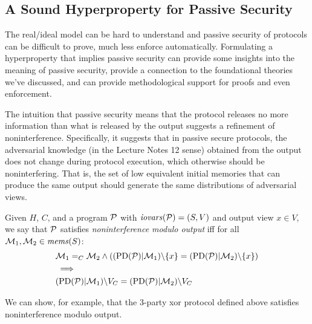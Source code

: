 
\subsection{A Sound Hyperproperty for Passive Security} The real/ideal
model can be hard to understand and passive security of protocols can
be difficult to prove, much less enforce automatically. Formulating
a hyperproperty that implies passive security can provide some
insights into the meaning of passive security, provide a connection
to the foundational theories we've discussed, and can provide
methodological support for proofs and even enforcement.

The intuition that passive security means that the protocol releases
no more information than what is released by the output suggests a
refinement of noninterference. Specifically, it suggests that in
passive secure protocols, the adversarial knowledge (in the Lecture
Notes 12 sense) obtained from the output does not change during
protocol execution, which otherwise should be noninterfering.  That
is, the set of low equivalent initial memories that can produce the
same output should generate the same distributions of adversarial
views. 
\begin{definition}
  Given $H$, $C$, and a program $\mathcal{P}$ with $\mathit{iovars}(\mathcal{P}) = (S,V)$ and output
  view $x \in V$, we say that
  $\mathcal{P}$ satisfies \emph{noninterference modulo output} iff for all
  $\mathcal{M}_1,\mathcal{M}_2 \in \mathit{mems}(S)$:
  \begin{eqnarray*}
    & \mathcal{M}_1 =_C \mathcal{M}_2 \wedge
     ((\mathrm{PD}(\mathcal{P})|\mathcal{M}_1)\backslash\{ x \} =
     (\mathrm{PD}(\mathcal{P})|\mathcal{M}_2)\backslash\{ x \}) \\
    & \implies \\
    & (\mathrm{PD}(\mathcal{P})|\mathcal{M}_1)\backslash V_C =
    (\mathrm{PD}(\mathcal{P})|\mathcal{M}_2)\backslash V_C
  \end{eqnarray*}
\end{definition}
We can show, for example, that the 3-party xor protocol defined above
satisfies noninterference modulo output.


